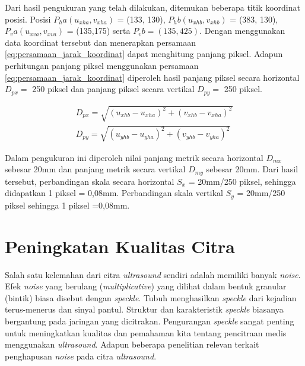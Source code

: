 Dari hasil pengukuran yang telah dilakukan, ditemukan beberapa titik koordinat posisi. Posisi $P_ha(u_{xha}, v_{xha})$ = (133, 130), $P_hb(u_{xhb}, v_{xhb})$ = (383, 130), $P_va(u_{xva}, v_{xva})$ = (135,175) serta $P_vb = (135, 425)$. Dengan menggunakan data koordinat tersebut dan menerapkan persamaan \ref{eq:persamaan_jarak_koordinat} dapat menghitung panjang piksel. Adapun perhitungan panjang piksel menggunakan persamaan \ref{eq:persamaan_jarak_koordinat} diperoleh hasil panjang piksel secara horizontal $D_{px} =$ 250 piksel dan panjang piksel secara vertikal $D_{py} =$ 250 piksel.   


\begin{equation}
	\begin{aligned}
		D_{px} = \sqrt{(u_{xhb} - u_{xha})^2 + (v_{xhb} - v_{xha})^2 } \\[10pt]
		D_{py} = \sqrt{(u_{yhb} - u_{yha})^2 + (v_{yhb} - v_{yha})^2 }
	\end{aligned}
	\label{eq:persamaan_jarak_koordinat}
\end{equation} 

Dalam pengukuran ini diperoleh nilai panjang metrik secara horizontal $D_{mx}$ sebesar 20mm dan panjang metrik secara vertikal $D_{my}$ sebesar 20mm. Dari hasil tersebut, perbandingan skala secara horizontal $S_x$ = 20mm/250 piksel, sehingga didapatkan 1 piksel = 0,08mm. Perbandingan skala vertikal $S_y$ = 20mm/250 piksel sehingga 1 piksel =0,08mm.

%
\section{Peningkatan Kualitas Citra}
Salah satu kelemahan dari citra \textit{ultrasound} sendiri adalah memiliki banyak \textit{noise}. Efek \textit{noise} yang berulang (\textit{multiplicative}) yang dilihat dalam bentuk granular (bintik) biasa disebut dengan \textit{speckle}\cite{made2020}. Tubuh menghasilkan \textit{speckle} dari kejadian terus-menerus dan sinyal pantul. Struktur dan karakteristik \textit{speckle} biasanya bergantung pada jaringan yang dicitrakan. Pengurangan \textit{speckle} sangat penting untuk meningkatkan kualitas dan pemahaman kita tentang pencitraan medis menggunakan \textit{ultrasound}. Adapun beberapa penelitian relevan terkait penghapusan \textit{noise} pada citra \textit{ultrasound}.

